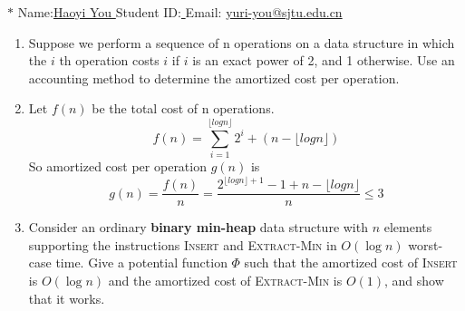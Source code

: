 \documentclass[12pt,a4paper]{article}
\makeatletter
\newtheorem*{solution}{Solution}
\theoremstyle{definition}
\renewenvironment{solution}[1][Solution] {\par\pushQED{\qed}\normalfont\topsep6\p@\@plus6\p@\relax\trivlist\item[\hskip\labelsep\bfseries#1\@addpunct{.}]\ignorespaces}{\popQED\endtrivlist\@endpefalse} \makeatother
\makeatother
\begin{document}
\noindent

\noindent{}
\begin{center}
\footnotesize{\color{blue}$*$ Name:\underline{\quad   Haoyi You  \quad  }\quad Student ID:\underline{ \quad} \quad Email: \underline{\quad yuri-you@sjtu.edu.cn \quad}}
\end{center}
\begin{enumerate}
	\item Suppose we perform a sequence of n operations on a data structure in which the $i$ th 		operation costs $i$ if $i$ is an exact power of 2, and 1 otherwise. Use an accounting method to determine the amortized cost per operation.
	\begin{solution}
	Let $f(n)$ be the total cost of n operations.
	\begin{equation}
	    f(n)=\sum_{i=1}^{\lfloor logn \rfloor}2^i+(n-\lfloor logn \rfloor)
	\end{equation}
	So amortized cost per operation $g(n)$ is 
	\begin{equation}
	    g(n)=\frac{f(n)}{n}=\frac{2^{\lfloor logn \rfloor+1}-1+n-\lfloor logn \rfloor}{n} \le 3
	\end{equation}
	\end{solution}
	\item Consider an ordinary \textbf{binary min-heap} data structure with $n$ elements supporting
the instructions \textsc{Insert} and \textsc{Extract-Min} in $O(\log n)$ worst-case time. Give a
potential function $\Phi$ such that the amortized cost of \textsc{Insert} is $O(\log n)$ and the
amortized cost of \textsc{Extract-Min} is $O(1)$, and show that it works.
    

\end{enumerate}
\end{document}

